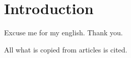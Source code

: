 \section*{Introduction}

Excuse me for my english. Thank you. 

All what is copied from articles is cited. 





